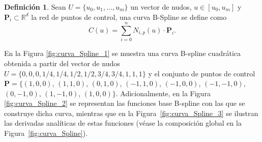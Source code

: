 \documentclass[11pt]{book}
\theoremstyle{plain} %
\theoremstyle{definition} %
\newtheorem*{defin}{Definición} %
\theoremstyle{definition} %
\begin{document}
    
\vspace{-0.1cm}

\begin{defin}
    Sean $U = \{u_0, u_1, \ldots, u_m\}$ un vector de nudos, $u \in [u_0, u_m]$ y $\mathbf{P}_i \subset \mathbb{R}^d$ la red de puntos de control,
    una curva B-Spline se define como    
    \vspace{-0.3cm}
    \begin{equation*}
        C(u) = \sum_{i=0}^{n} N_{i,p}(u) \cdot \mathbf{P}_i.
    \end{equation*}
\end{defin}


En la Figura \ref{fig:curva_Spline_1} se muestra una curva B-spline cuadrática obtenida a partir del vector de nudos $U = \{ 0, 0, 0, 1/4, 1/4, 1/2, 1/2, 3/4, 3/4, 1, 1, 1 \}$ y el conjunto de puntos de control $\mathbf{P} = \{ (1,0,0)$, $(1,1,0)$, $(0,1,0)$, $(-1,1,0)$, $(-1,0,0)$, $(-1,-1,0)$, $(0,-1,0)$, $(1,-1,0)$, $(1,0,0) \}$. Adicionalmente, en la Figura \ref{fig:curva_Spline_2} se representan las funciones base B-spline con las que se construye dicha curva, mientras que en la Figura~\ref{fig:curva_Spline_3} se ilustran las derivadas analíticas de estas funciones (véase la composición global en la Figura~\ref{fig:curva_Spline}).
\end{document}
